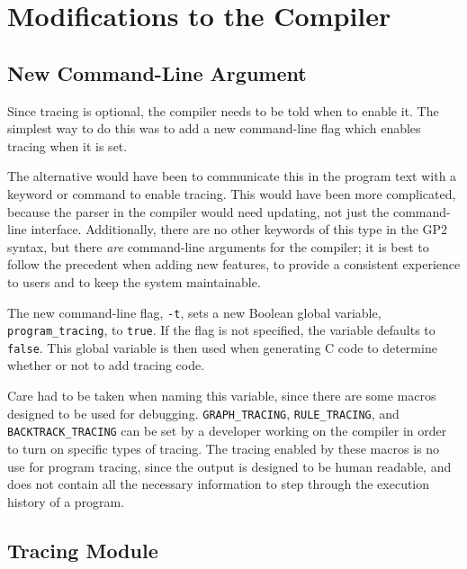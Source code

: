 \documentclass[authoryearcitations]{UoYCSproject}
\begin{document}
\section{Modifications to the Compiler}
\label{sec:ModificationsToCompiler}

\subsection{New Command-Line Argument}
\label{sec:NewCommandLineArgument}

Since tracing is optional, the compiler needs to be told when to enable it. The
simplest way to do this was to add a new command-line flag which enables tracing
when it is set.

The alternative would have been to communicate this in the program text with a
keyword or command to enable tracing. This would have been more complicated,
because the parser in the compiler would need updating, not just the command-line
interface. Additionally, there are no other keywords of this type in the GP2
syntax, but there \emph{are} command-line arguments for the compiler; it is best
to follow the precedent when adding new features, to provide a consistent
experience to users and to keep the system maintainable.

The new command-line flag, \texttt{-t}, sets a new Boolean global variable,
\texttt{program\_tracing}, to \texttt{true}. If the flag is not specified, the
variable defaults to \texttt{false}. This global variable is then used when
generating C code to determine whether or not to add tracing code.

Care had to be taken when naming this variable, since there are some macros
designed to be used for debugging. \texttt{GRAPH\_TRACING}, \texttt{RULE\_TRACING},
and \texttt{BACKTRACK\_TRACING} can be set by a developer working on the compiler
in order to turn on specific types of tracing. The tracing enabled by these macros
is no use for program tracing, since the output is designed to be human readable,
and does not contain all the necessary information to step through the execution
history of a program.


\subsection{Tracing Module}
\label{sec:TracingModule}
\end{document}
